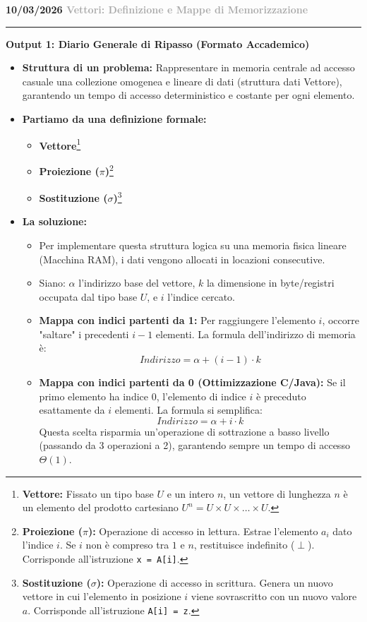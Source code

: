 \documentclass[a4paper, 11pt]{report}
\newcommand{\lezione}[2]{
\vspace{2em}
\noindent\textbf{\Large #1 \hfill \textcolor{darkgray}{#2}}
\vspace{0.5em}
\hrule
\vspace{1.5em}
}
\newcommand{\definizione}[2]{%
\textbf{#1}\footnote{\textbf{#1:} #2}%
}
\begin{document}
\lezione{10/03/2026}{Vettori: Definizione e Mappe di Memorizzazione}

\vspace{0.5cm}
\textbf{Output 1: Diario Generale di Ripasso (Formato Accademico)}

\begin{itemize}
    \item \textbf{Struttura di un problema:}
    Rappresentare in memoria centrale ad accesso casuale una collezione omogenea e lineare di dati (struttura dati Vettore), garantendo un tempo di accesso deterministico e costante per ogni elemento.

    \item \textbf{Partiamo da una definizione formale:}
    \begin{itemize}
        \item \definizione{Vettore}{Fissato un tipo base $U$ e un intero $n$, un vettore di lunghezza $n$ è un elemento del prodotto cartesiano $U^n = U \times U \times \dots \times U$.}
        \item \definizione{Proiezione ($\pi$)}{Operazione di accesso in lettura. Estrae l'elemento $a_i$ dato l'indice $i$. Se $i$ non è compreso tra $1$ e $n$, restituisce indefinito ($\perp$). Corrisponde all'istruzione \texttt{x = A[i]}.}
        \item \definizione{Sostituzione ($\sigma$)}{Operazione di accesso in scrittura. Genera un nuovo vettore in cui l'elemento in posizione $i$ viene sovrascritto con un nuovo valore $a$. Corrisponde all'istruzione \texttt{A[i] = z}.}
    \end{itemize}

    \item \textbf{La soluzione:}
    \begin{itemize}
        \item Per implementare questa struttura logica su una memoria fisica lineare (Macchina RAM), i dati vengono allocati in locazioni consecutive.
        \item Siano: $\alpha$ l'indirizzo base del vettore, $k$ la dimensione in byte/registri occupata dal tipo base $U$, e $i$ l'indice cercato.
        \item \textbf{Mappa con indici partenti da 1:} Per raggiungere l'elemento $i$, occorre "saltare" i precedenti $i-1$ elementi. La formula dell'indirizzo di memoria è:
        \[ Indirizzo = \alpha + (i - 1) \cdot k \]
        \item \textbf{Mappa con indici partenti da 0 (Ottimizzazione C/Java):} Se il primo elemento ha indice 0, l'elemento di indice $i$ è preceduto esattamente da $i$ elementi. La formula si semplifica:
        \[ Indirizzo = \alpha + i \cdot k \]
        Questa scelta risparmia un'operazione di sottrazione a basso livello (passando da 3 operazioni a 2), garantendo sempre un tempo di accesso $\Theta(1)$.
    \end{itemize}
\end{itemize}
\end{document}
